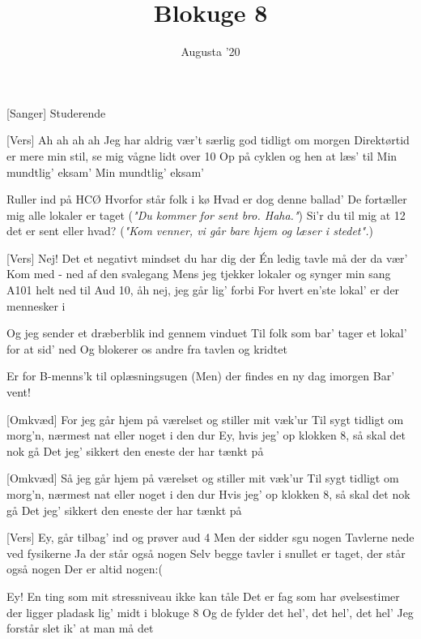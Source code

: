 \documentclass[a4paper,11pt]{article}
\title{Blokuge 8}
\author{Augusta '20}
\begin{document}
\maketitle

\begin{roles}
[Sanger] Studerende
\end{roles}

\begin{song}
[Vers] 
Ah ah ah ah 
Jeg har aldrig vær't særlig god tidligt om morgen 
Direktørtid er mere min stil, se mig vågne lidt over 10 
Op på cyklen og hen at læs' til 
Min mundtlig' eksam' 
Min mundtlig' eksam'

Ruller ind på HCØ 
Hvorfor står folk i kø 
Hvad er dog denne ballad'
De fortæller mig alle lokaler er taget 
(\textit{"Du kommer for sent bro. Haha."})
Si'r du til mig at 12 det er sent eller hvad? 
(\textit{"Kom venner, vi går bare hjem og læser i stedet".})

[Vers]
Nej! 
Det et negativt mindset du har dig der  
Én ledig tavle må der da vær'
Kom med - ned af den svalegang
Mens jeg tjekker lokaler og synger min sang
A101 helt ned til Aud 10, åh nej, jeg går lig' forbi 
For hvert en'ste lokal' er der mennesker i

Og jeg sender et dræberblik ind gennem vinduet 
Til folk som bar' tager et lokal' for at sid' ned 
Og blokerer os andre fra tavlen og kridtet 

Er for B-menns'k til oplæsningsugen
(Men) der findes en ny dag imorgen 
Bar' vent!

[Omkvæd] 
For jeg går hjem på værelset og stiller mit væk'ur 
Til sygt tidligt om morg'n, nærmest nat eller noget i den dur 
Ey, hvis jeg' op klokken 8, så skal det nok gå
Det jeg' sikkert den eneste der har tænkt på 

[Omkvæd] 
Så jeg går hjem på værelset og stiller mit væk'ur 
Til sygt tidligt om morg'n, nærmest nat eller noget i den dur 
Hvis jeg' op klokken 8, så skal det nok gå
Det jeg' sikkert den eneste der har tænkt på 

[Vers] 
Ey, går tilbag' ind og prøver aud 4 
Men der sidder sgu nogen
Tavlerne nede ved fysikerne
Ja der står også nogen
Selv begge tavler i snullet er taget, der står også nogen
Der er altid nogen:(

Ey! En ting som mit stressniveau ikke kan tåle
Det er fag som har øvelsestimer der ligger pladask lig' midt i blokuge 8
Og de fylder det hel', det hel', det hel'
Jeg forstår slet ik' at man må det


\end{song}
\end{document}
